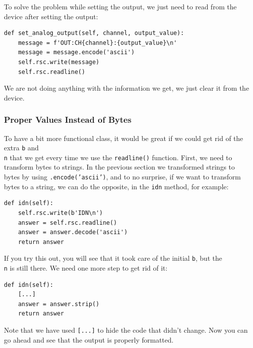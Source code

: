 To solve the problem while setting the output, we just need to read from the device after setting the output:

\begin{verbatim}
def set_analog_output(self, channel, output_value):
    message = f'OUT:CH{channel}:{output_value}\n'
    message = message.encode('ascii')
    self.rsc.write(message)
    self.rsc.readline()
\end{verbatim}

We are not doing anything with the information we get, we just clear it from the device.

\subsubsection{Proper Values Instead of Bytes}
To have a bit more functional class, it would be great if we could get rid of the extra \texttt{b} and \texttt{\\n} that we get every time we use the \texttt{readline()} function. First, we need to transform bytes to strings. In the previous section we transformed strings to bytes by using \texttt{.encode('ascii')}, and to no surprise, if we want to transform bytes to a string, we can do the opposite, in the \texttt{idn} method, for example:

\begin{verbatim}
def idn(self):
    self.rsc.write(b'IDN\n')
    answer = self.rsc.readline()
    answer = answer.decode('ascii')
    return answer
\end{verbatim}

If you try this out, you will see that it took care of the initial \texttt{b}, but the \texttt{\\n} is still there. We need one more step to get rid of it:

\begin{verbatim}
def idn(self):
    [...]
    answer = answer.strip()
    return answer
\end{verbatim}

Note that we have used \texttt{[...]} to hide the code that didn't change. Now you can go ahead and see that the output is properly formatted.


